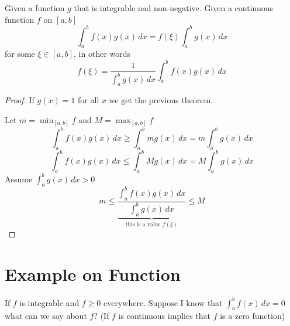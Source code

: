 \begin{theorem*}
  Given a function $g$ that is integrable nad non-negative. 
  Given a continuous function $f$ on $[a, b]$ 
  \[\int_a^b f(x)g(x)\,dx = f(\xi)\int_a^b g(x)\,dx\]
  for some $\xi \in [a, b]$, in other words
  \[ f(\xi) = \frac{1}{\int_a^b g(x)\,dx} \displaystyle\int_a^b f(x)g(x)\,dx\]
\end{theorem*}

\begin{proof}
  If $g(x) = 1$ for all $x$ we get the previous theorem.

  Let $m = \min_{[a, b]} f$ and $M = \max_{[a, b]} f$
  \[ \int_a^b f(x)g(x)\,dx \ge \int_a^b mg(x)\,dx = m\int_a^bg(x)\,dx\]
  \[ \int_a^b f(x)g(x)\,dx \le \int_a^b Mg(x)\,dx = M\int_a^bg(x)\,dx\]
  Assume $\displaystyle \int_a^b g(x)\, dx > 0$
  \[m \le \underbrace{\frac{\displaystyle\int_a^b f(x)g(x)\,dx}{\displaystyle\int_a^b g(x) \,dx}}_{\text{this is a value } f(\xi)} \le M\]
\end{proof}

\section{Example on Function}

If $f$ is integrable and $f \ge 0$ everywhere.
Suppose I know that $\int_a^b f(x)\,dx = 0$
what can we say about $f$?
(If $f$ is continuous implies that $f$ is a zero function)

